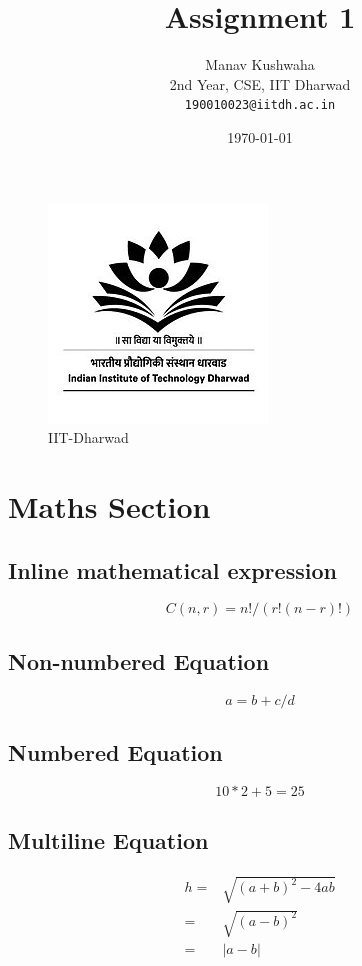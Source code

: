 \documentclass{article}
\begin{document}
\title{\textbf{Assignment 1} }
\author{Manav Kushwaha \\
2nd Year, CSE, IIT Dharwad \\
\texttt{190010023@iitdh.ac.in}}
\date{\today}
\maketitle

\begin{figure}[h]
    \centering
    \includegraphics{images/IITDH.jpg}
    \caption{IIT-Dharwad}
    \label{fig:IIT-Logo}
\end{figure}

\newpage
\tableofcontents
\listoffigures
\listoftables

\newpage

\section{Maths Section}
\label{sec:math}
    \hfill
    \subsection{Inline mathematical expression}
         $$C(n,r) = n!/(r! (n - r)!)$$
    
    \subsection{Non-numbered Equation}
        $$a = b + c/d$$
        
    \subsection{Numbered Equation}
        $$10*2+5=25$$
        
    \subsection{Multiline Equation}
        \begin{equation}    \label{eq:multiline eq}
        \begin{aligned}
            h = & \sqrt{(a+b)^2-4ab} \\ 
              = & \sqrt{(a-b)^2} \\  
              = & |a-b|   
        \end{aligned}
        \end{equation}
    
\end{document}
